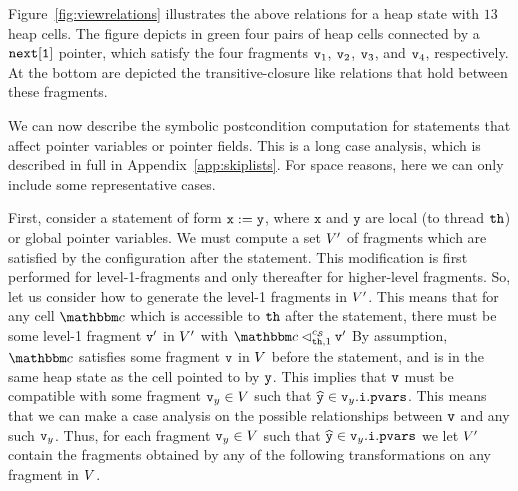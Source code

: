 
Figure~\ref{fig:viewrelations} illustrates the above relations for a heap state
with $13$ heap cells. The figure depicts in green
four pairs of heap cells connected by a $\tt next[1]$ pointer, which satisfy
the four fragments $\mathtt{v}_1$, $\mathtt{v}_2$, $\mathtt{v}_3$, and $\mathtt{v}_4$, respectively.
At the bottom are depicted the transitive-closure like relations that hold
between these fragments.

We can now describe the symbolic postcondition computation for
statements that affect pointer variables or pointer fields. This is a long
case analysis, which is described in full in Appendix~\ref{app:skiplists}.
For space reasons, here we can only include some representative cases.

First, consider a statement of form
${\tt x := y}$, where $\mathtt{x}$ and $\mathtt{y}$ are local
(to thread ${\tt th}$) or global pointer variables.
We must compute a set $V'$ of
fragments which are satisfied by the configuration after the statement.
This modification is first performed for
level-1-fragments and only thereafter for higher-level fragments.
So, let us consider how to generate the level-1 fragments in $V'$. This
means that for any cell $\cell$ which is accessible to ${\tt th}$ after
the statement, there must be some level-1 fragment $\mathtt{v}'$ in $V'$
with $\cell \lsatfrag{1}{\thread}{\sconf} \frag'$
By assumption, $\cell$ satisfies some fragment $\mathtt{v}$ in $V$
before the statement, and is in the same heap state as the cell pointed to by
$\mathtt{y}$.
This implies that $\mathtt{v}$ must be compatible with some
fragment $\mathtt{v}_y\in V$ such that $\widehat{\mathtt{y}} \in \mathtt{v}_y.\mathtt{i}.\mathtt{pvars}$. This means that we can make a case analysis on the possible relationships
between $\mathtt{v}$ and any such $\mathtt{v}_y$.
Thus, for each fragment $\mathtt{v}_y\in V$ such that
$\widehat{\mathtt{y}} \in \mathtt{v}_y.\mathtt{i}.\mathtt{pvars}$ we let $V'$ contain
the fragments obtained by any of the following transformations on any fragment in
$V$.

